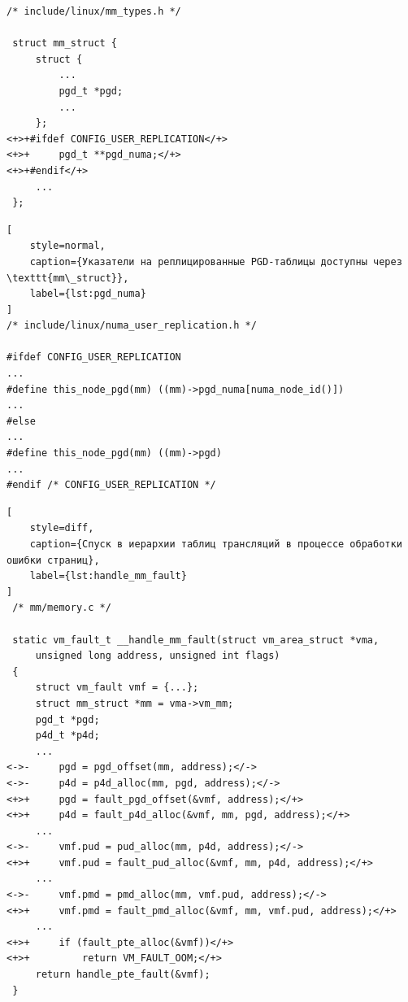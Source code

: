 
\begin{lstlisting}[style=diff]
 /* include/linux/mm_types.h */

 struct mm_struct {
	 struct {
		 ...
		 pgd_t *pgd;
		 ...
	 };
<+>+#ifdef CONFIG_USER_REPLICATION</+>
<+>+	 pgd_t **pgd_numa;</+>
<+>+#endif</+>
	 ...
 };
\end{lstlisting}
\begin{lstlisting}[
	style=normal,
	caption={Указатели на реплицированные PGD-таблицы доступны через \texttt{mm\_struct}},
	label={lst:pgd_numa}
]
/* include/linux/numa_user_replication.h */

#ifdef CONFIG_USER_REPLICATION
...
#define this_node_pgd(mm) ((mm)->pgd_numa[numa_node_id()])
...
#else
...
#define this_node_pgd(mm) ((mm)->pgd)
...
#endif /* CONFIG_USER_REPLICATION */
\end{lstlisting}
\vspace{0.5cm}


\begin{lstlisting}[
	style=diff,
	caption={Спуск в иерархии таблиц трансляций в процессе обработки ошибки страниц},
	label={lst:handle_mm_fault}
]
 /* mm/memory.c */

 static vm_fault_t __handle_mm_fault(struct vm_area_struct *vma,
	 unsigned long address, unsigned int flags)
 {
	 struct vm_fault vmf = {...};
	 struct mm_struct *mm = vma->vm_mm;
	 pgd_t *pgd;
	 p4d_t *p4d;
	 ...
<->-	 pgd = pgd_offset(mm, address);</->
<->-	 p4d = p4d_alloc(mm, pgd, address);</->
<+>+	 pgd = fault_pgd_offset(&vmf, address);</+>
<+>+	 p4d = fault_p4d_alloc(&vmf, mm, pgd, address);</+>
	 ...
<->-	 vmf.pud = pud_alloc(mm, p4d, address);</->
<+>+	 vmf.pud = fault_pud_alloc(&vmf, mm, p4d, address);</+>
	 ...
<->-	 vmf.pmd = pmd_alloc(mm, vmf.pud, address);</->
<+>+	 vmf.pmd = fault_pmd_alloc(&vmf, mm, vmf.pud, address);</+>
	 ...
<+>+	 if (fault_pte_alloc(&vmf))</+>
<+>+		 return VM_FAULT_OOM;</+>
	 return handle_pte_fault(&vmf);
 }
\end{lstlisting}
\vspace{0.5cm}


